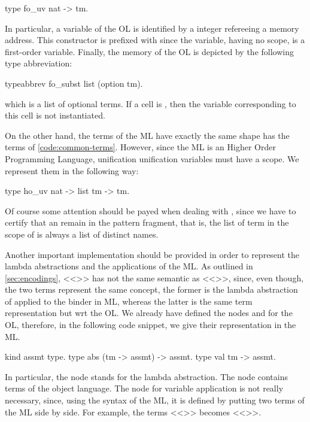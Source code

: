 \documentclass[sigconf,natbib=false]{acmart}
\begin{document}
\begin{elpicode}
  type fo_uv nat -> tm.
\end{elpicode}

\noindent 
In particular, a variable of the OL is identified by a integer
refereeing a memory address. This constructor is prefixed with  since
the variable, having no scope, is a first-order variable. Finally, the memory of
the OL is depicted by the following type abbreviation:

\begin{elpicode}
  typeabbrev fo_subst list (option tm).
\end{elpicode}

\noindent 
which is a list of optional terms. If a cell is , then the variable
corresponding to this cell is not instantiated.

On the other hand, the terms of the ML have exactly the same shape
has the terms of \cref{code:common-terms}. However, since the ML is an Higher
Order Programming Language, unification unification variables must have a scope.
We represent them in the following way:

\begin{elpicode}
  type ho_uv nat -> list tm -> tm.
\end{elpicode}

Of course some attention
should be payed when dealing with , since we have to certify
that an  remain in the pattern fragment, that is, the
list of term in the scope of  is always a list of distinct names.

Another important implementation should be provided in order to represent the
lambda abstractions and the applications of the ML. As outlined in
\cref{sec:encodings}, <<>> has not the same semantic as 
<<>>, since, even though, the two terms represent the same
concept, the former is the lambda abstraction of  applied to the 
binder in ML, whereas the latter is the same term representation but wrt the OL.
We already have defined the nodes  and  for the OL,
therefore, in the following code snippet, we give their representation in the
ML.

\begin{elpicode}
  kind assmt type.
  type abs (tm -> assmt) -> assmt.
  type val tm -> assmt.
\end{elpicode}

\noindent
In particular, the node  stands for the lambda abstraction. The
node  contains terms of the object language. The node for variable
application is not really necessary, since, using the syntax of the ML, it is
defined by putting two terms of the ML side by side. For example, the terms 
<<>> becomes <<>>.
\end{document}
